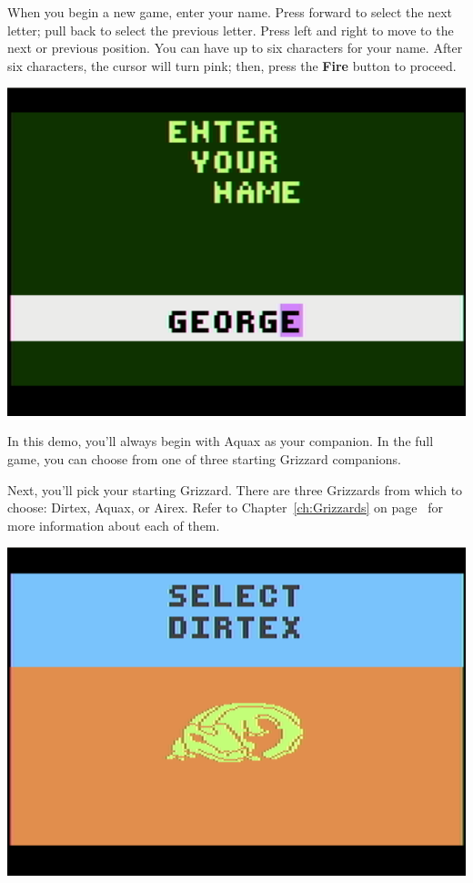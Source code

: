 \documentclass[10pt,twocolumn,openany,article]{memoir}
\begin{document}
\ifdefined\NOSAVE\else

When you begin a new game, enter  your name. Press forward to select the
next letter;  pull back to  select the  previous letter. Press  left and
right to move to  the next or previous position. You can  have up to six
characters for  your name.  After six characters,  the cursor  will turn
pink; then, press the \textbf{Fire} button to proceed.

\begin{center}
  \includegraphics[width=\columnwidth]{../Manual/NameEntryNTSC.png}
\end{center}

\ifdefined\DEMO

In this demo,  you'll always begin with Aquax as  your companion. In the
full game, you can choose from one of three starting Grizzard companions.

\else

Next, you'll pick your starting Grizzard. There are three Grizzards from
which    to    choose:   Dirtex,    Aquax,    or    Airex.   Refer    to
Chapter~\ref{ch:Grizzards}   on  page~\pageref{ch:Grizzards}   for  more
information about each of them.

\begin{center}
  \includegraphics[width=\columnwidth]{../Manual/GrizzardChooserNTSC.png}
\end{center}
\end{document}
